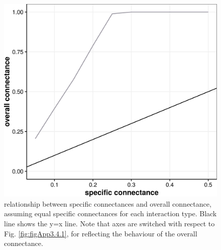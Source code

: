 \begin{figure}[!ht]
\centering
\includegraphics[width=.5\textwidth]{./Figures/Appendix3_4/Fig_2.png}
\caption[Overall and specific-type connectances]{\color{Gray} relationship between specific connectances and overall connectance, assuming equal specific connectances for each interaction type. Black line shows the y=x line. Note that axes are switched with respect to Fig. \ref{fig:figApp3.4.1}, for reflecting the behaviour of the overall connectance.}
\label{fig:figApp3.4.2}
\end{figure}
